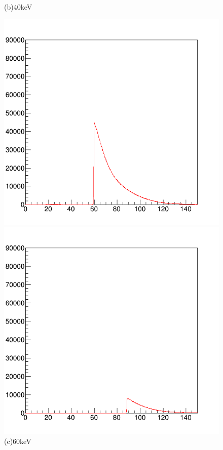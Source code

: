 \begin{figure}[H]
\begin{minipage}{0.52\hsize}
\begin{center}
  \end{center}  
\vspace{-1cm}
\caption*{(b)40keV}
 \end{minipage}
   \begin{minipage}{0.5\hsize}
  \begin{center}
       \includegraphics[bb=0.000000 0.000000 596.000000 574.000000,width=1.0\hsize]{image2/chapter5/120kV_0.1mA_60keV_100sec.png}
  \end{center}
  \vspace{-1cm}
\caption*{(c)60keV}
 \end{minipage}
 \begin{minipage}{0.5\hsize}
  \begin{center}
     \includegraphics[bb=0.000000 0.000000 596.000000 574.000000,width=1.0\hsize]{image2/chapter5/120kV_0.1mA_90keV_100sec.png}

\end{center}
\end{minipage}
\end{figure}
